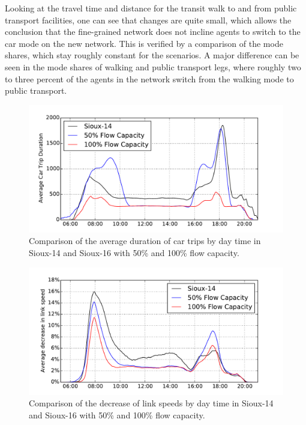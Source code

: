 Looking at the travel time and distance for the transit walk to and from public
transport facilities, one can see that changes are quite small, which allows the
conclusion that the fine-grained network does not incline agents to switch to the
car mode on the new network. This is verified by a comparison of the mode shares,
which stay roughly constant for the scenarios. A major difference can be seen in
the mode shares of walking and public transport legs, where roughly two to three
percent of the agents in the network switch from the walking mode to public
transport.

\begin{figure}
    \centering
    \includegraphics[width=1.0\textwidth]{figures/sioux_times.pdf}
    \caption{Comparison of the average duration of car trips by day time in Sioux-14 and Sioux-16 with 50\% and 100\% flow capacity.}
    \label{fig:sioux_times}
\end{figure}

\begin{figure}
    \centering
    \includegraphics[width=1.0\textwidth]{figures/sioux_speeds.pdf}
    \caption{Comparison of the decrease of link speeds by day time in Sioux-14 and Sioux-16 with 50\% and 100\% flow capacity.}
    \label{fig:sioux_speeds}
\end{figure}


